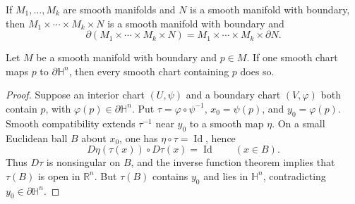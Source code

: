 \begin{proposition}
\label{prop:1-45}
\mathlibok
{}
If $M_1,\ldots,M_k$ are smooth manifolds and $N$ is a smooth manifold with
boundary, then $M_1\times\cdots\times M_k\times N$ is a smooth manifold with
boundary and
\[
\partial(M_1\times\cdots\times M_k\times N)
=M_1\times\cdots\times M_k\times\partial N.
\]
\end{proposition}

\begin{theorem}
\label{thm:1-46}
\leanok
{}
Let $M$ be a smooth manifold with boundary and $p\in M$. If one smooth chart
maps $p$ to $\partial\mathbb H^n$, then every smooth chart containing $p$ does
so.
\end{theorem}

\begin{proof}
\leanok
\sketch Suppose an interior chart $(U,\psi)$ and a boundary chart
$(V,\varphi)$ both contain $p$, with $\varphi(p)\in\partial\mathbb H^n$. Put
$\tau=\varphi\circ\psi^{-1}$, $x_0=\psi(p)$, and $y_0=\varphi(p)$. Smooth
compatibility extends $\tau^{-1}$ near $y_0$ to a smooth map $\eta$. On a
small Euclidean ball $B$ about $x_0$, one has
$\eta\circ\tau=\operatorname{Id}$, hence
\[
D\eta(\tau(x))\circ D\tau(x)=\operatorname{Id}\qquad(x\in B).
\]
Thus $D\tau$ is nonsingular on $B$, and the inverse function theorem implies
that $\tau(B)$ is open in $\mathbb R^n$. But $\tau(B)$ contains $y_0$ and lies
in $\mathbb H^n$, contradicting $y_0\in\partial\mathbb H^n$.
\end{proof}
